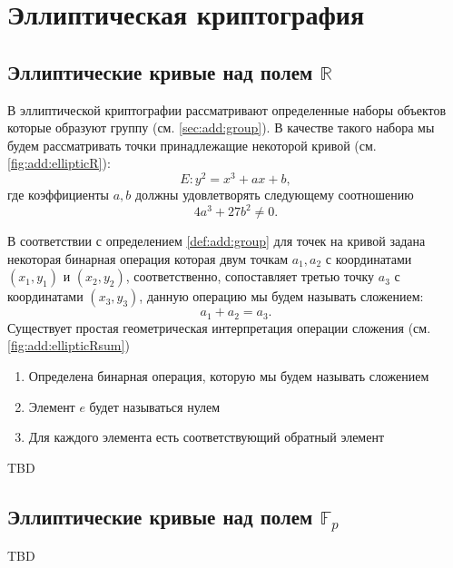 \section{Эллиптическая криптография}

\subsection{Эллиптические кривые над полем $\mathbb{R}$}



В эллиптической криптографии рассматривают определенные наборы
объектов которые образуют группу (см. \autoref{sec:add:group}). В
качестве такого набора мы будем рассматривать точки принадлежащие
некоторой кривой (см. \autoref{fig:add:ellipticR}): 
\[
E: y^2 = x^3 +a x + b,
\]
где коэффициенты $a,b$ должны удовлетворять следующему соотношению
\[
4 a^3 + 27 b^2 \ne 0.
\]



В соответствии с определением \ref{def:add:group} для точек на кривой 
задана некоторая бинарная операция которая двум точкам $a_1, a_2$ с
координатами $(x_1, y_1)$ и $(x_2, y_2)$, соответственно, сопоставляет
третью точку $a_3$ с 
координатами $(x_3, y_3)$, данную операцию мы будем называть
сложением:
\[
a_1 + a_2 = a_3.
\]
Существует простая геометрическая интерпретация операции сложения (см.
\autoref{fig:add:ellipticRsum})



\begin{enumerate}
\item Определена бинарная операция, которую мы будем называть сложением
\item Элемент $e$ будет называться нулем
\item Для каждого элемента есть соответствующий обратный элемент
\end{enumerate}
TBD

\subsection{Эллиптические кривые над полем $\mathbb{F}_p$}
TBD
